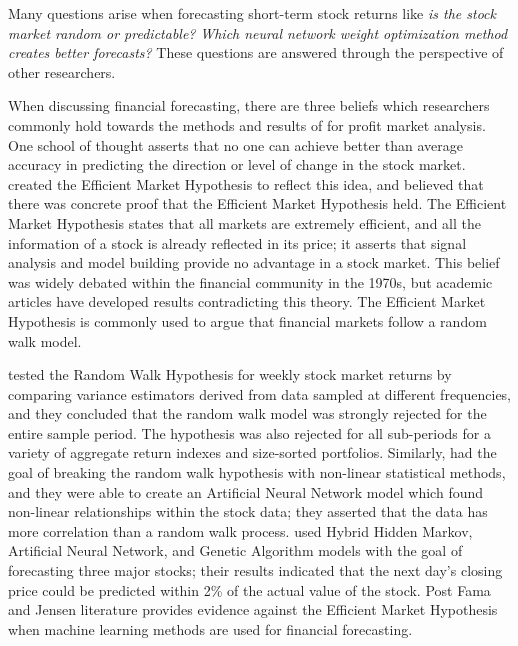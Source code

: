Many questions arise when forecasting short-term stock returns like
\textit{is the stock market random or predictable?}
\textit{Which neural network weight optimization method creates better forecasts?}
These questions are answered through the perspective of other researchers.

When discussing financial forecasting, there are three beliefs which researchers commonly hold towards the methods and results of for profit market analysis.
One school of thought asserts that no one can achieve better than average accuracy in predicting the direction or level of change in the stock market.
\citet{Fama:1970} created the Efficient Market Hypothesis to reflect this idea, and \citet{Jensen:1978} believed that there was concrete proof that the Efficient Market Hypothesis held.
The Efficient Market Hypothesis states that all markets are extremely efficient, and all the information of a stock is already reflected in its price; it asserts that signal analysis and model building provide no advantage in a stock market.
This belief was widely debated within the financial community in the 1970s, but academic articles have developed results contradicting this theory.
The Efficient Market Hypothesis is commonly used to argue that financial markets follow a random walk model.

\citet{Lo:1988} tested the Random Walk Hypothesis for weekly stock market returns by comparing variance estimators derived from data sampled at different frequencies, and they concluded that the random walk model was strongly rejected for the entire sample period.
The hypothesis was also rejected for all sub-periods for a variety of aggregate return indexes and size-sorted portfolios.
Similarly, \citet{Lendasse:2000} had the goal of breaking the random walk hypothesis with non-linear statistical methods, and they were able to create an Artificial Neural Network model which found non-linear relationships within the stock data; they asserted that the data has more correlation than a random walk process.
\citet{Hassan:2007} used Hybrid Hidden Markov, Artificial Neural Network, and Genetic Algorithm models with the goal of forecasting three major stocks; their results indicated that the next day’s closing price could be predicted within 2\% of the actual value of the stock.
Post Fama and Jensen literature provides evidence against the Efficient Market Hypothesis when machine learning methods are used for financial forecasting.

